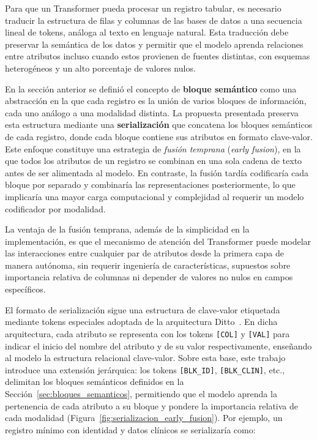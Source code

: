 Para que un Transformer pueda procesar un registro tabular, es necesario traducir la estructura de filas y columnas de las bases de datos a una secuencia lineal de tokens, análoga al texto en lenguaje natural. Esta traducción debe preservar la semántica de los datos y permitir que el modelo aprenda relaciones entre atributos incluso cuando estos provienen de fuentes distintas, con esquemas heterogéneos y un alto porcentaje de valores nulos.

En la sección anterior se definió el concepto de \textbf{bloque semántico} como una abstracción en la que cada registro es la unión de varios bloques de información, cada uno análogo a una modalidad distinta. La propuesta presentada preserva esta estructura mediante una \textbf{serialización} que concatena los bloques semánticos de cada registro, donde cada bloque contiene sus atributos en formato clave-valor. Este enfoque constituye una estrategia de \textit{fusión temprana} (\textit{early fusion}), en la que todos los atributos de un registro se combinan en una sola cadena de texto antes de ser alimentada al modelo. En contraste, la fusión tardía codificaría cada bloque por separado y combinaría las representaciones posteriormente, lo que implicaría una mayor carga computacional y complejidad al requerir un modelo codificador por modalidad.

La ventaja de la fusión temprana, además de la simplicidad en la implementación, es que el mecanismo de atención del Transformer puede modelar las interacciones entre cualquier par de atributos desde la primera capa de manera autónoma, sin requerir ingeniería de características, supuestos sobre importancia relativa de columnas ni depender de valores no nulos en campos específicos.

El formato de serialización sigue una estructura de clave-valor etiquetada mediante tokens especiales adoptada de la arquitectura Ditto~\cite{li2020}. En dicha arquitectura, cada atributo se representa con los tokens \texttt{[COL]} y \texttt{[VAL]} para indicar el inicio del nombre del atributo y de su valor respectivamente, enseñando al modelo la estructura relacional clave-valor. Sobre esta base, este trabajo introduce una extensión jerárquica: los tokens \texttt{[BLK\_ID]}, \texttt{[BLK\_CLIN]}, etc., delimitan los bloques semánticos definidos en la Sección~\ref{sec:bloques_semanticos}, permitiendo que el modelo aprenda la pertenencia de cada atributo a su bloque y pondere la importancia relativa de cada modalidad (Figura~\ref{fig:serializacion_early_fusion}). Por ejemplo, un registro mínimo con identidad y datos clínicos se serializaría como:

